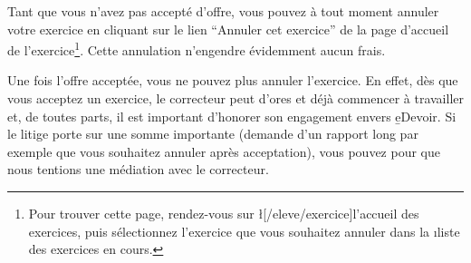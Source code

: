 ﻿Tant que vous n’avez pas accepté d’offre, vous pouvez à tout moment annuler votre exercice en cliquant sur le lien “Annuler cet exercice” de la page d’accueil de l’exercice\footnote{Pour trouver cette page, rendez-vous sur \l[/eleve/exercice]{l’accueil des exercices}, puis sélectionnez l’exercice que vous souhaitez annuler dans la \i{liste des exercices en cours}.}. Cette annulation n’engendre évidemment aucun frais.

Une fois l’offre acceptée, vous ne pouvez plus annuler l’exercice. En effet, dès que vous acceptez un exercice, le correcteur peut d’ores et déjà commencer à travailler et, de toutes parts, il est important d’honorer son engagement envers \b{eDevoir}.
Si le litige porte sur une somme importante (demande d’un rapport long par exemple que vous souhaitez annuler après acceptation), vous pouvez  pour que nous tentions une médiation avec le correcteur.